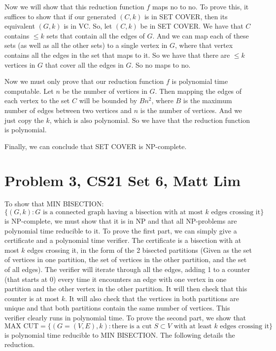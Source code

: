 \documentclass{article}
\begin{document}
Now we will show that this reduction function $f$ maps no to no. To prove this,
it suffices to show that if our generated $(C,k)$ is in SET COVER, then its
equivalent $(G,k)$ is in VC. So, let $(C,k)$ be in SET COVER. We have that
$C$ contains $\leq k$ sets that contain all the edges of $G$. And we can map
each of these sets (as well as all the other sets) to a single vertex in $G$,
where that vertex contains all the
edges in the set that maps to it. So we have that there are
$\leq k$ vertices in $G$ that cover all the edges in $G$. So no maps to no.

Now we must only prove that our reduction function $f$ is polynomial time
computable. Let $n$ be the number of vertices in $G$. Then mapping the edges of
each vertex to the set $C$ will be bounded by $Bn^2$, where $B$ is the maximum number of edges
between two vertices and $n$ is the number of vertices. And we just copy the
$k$, which is also polynomial.  So we have that the reduction function is polynomial.

Finally, we can conclude that SET COVER is NP-complete.
\newpage

\section*{Problem 3, CS21 Set 6, Matt Lim}
To show that MIN BISECTION:
\[ \{(G,k) : G \text{ is a connected graph having
a bisection with at most $k$ edges crossing it}\}\]
is NP-complete, we must show that it is in NP and that
all NP-problems are polynomial time reducible to it. To prove the first part,
we can simply give a certificate and a polynomial time verifier. The certificate
is a bisection with at most $k$ edges crossing it, in the form of the 2
bisected partitions (Given as the set of vertices in one partition, the set
of vertices in the other partition, and the set of all edges). The verifier
will iterate through all the edges, adding 1 to a counter (that starts at 0)
every time it encounters an edge with one vertex in one partition and the other
vertex in the other partition. It will then check that this counter is at most
$k$. It will also check that the vertices in both partitions are unique and
that both partitions contain the same number of vertices. This verifier clearly
runs in polynomial time.  To prove the second part, we show that
\[ \text{MAX CUT} = \{(G = (V,E), k) : \text{there is a cut $S \subset V$ with
at least $k$ edges crossing it}\} \]
is polynomial time reducible to MIN BISECTION. The following details the
reduction.
\end{document}
